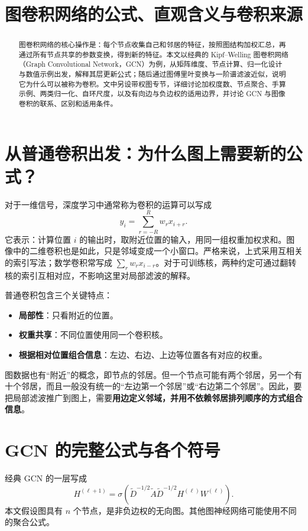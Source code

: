 \documentclass[UTF8,a4paper,11pt,fontset=fandol]{ctexart}
\title{图卷积网络的公式、直观含义与卷积来源}
\author{}
\date{}
\begin{document}
\maketitle
\begin{abstract}
图卷积网络的核心操作是：每个节点收集自己和邻居的特征，按照图结构加权汇总，再通过所有节点共享的参数变换，得到新的特征。本文以经典的 Kipf--Welling 图卷积网络（Graph Convolutional Network，GCN）为例，从矩阵维度、节点计算、归一化设计与数值示例出发，解释其层更新公式；随后通过图傅里叶变换与一阶谱滤波近似，说明它为什么可以被称为卷积。文中另设带权图专节，详细讨论加权度数、节点聚合、手算示例、两类归一化、自环尺度，以及有向边与负边权的适用边界，并讨论 GCN 与图像卷积的联系、区别和适用条件。
\end{abstract}
\tableofcontents
\newpage

\section{从普通卷积出发：为什么图上需要新的公式？}
对于一维信号，深度学习中通常称为卷积的运算可以写成
\begin{equation}
y_i=\sum_{r=-R}^{R}w_r x_{i+r}.
\end{equation}
它表示：计算位置 $i$ 的输出时，取附近位置的输入，用同一组权重加权求和。图像中的二维卷积也是如此，只是邻域变成一个小窗口。严格来说，上式采用互相关的索引写法；数学卷积常写成 $\sum_r w_r x_{i-r}$。对于可训练核，两种约定可通过翻转核的索引互相对应，不影响这里对局部滤波的解释。

普通卷积包含三个关键特点：
\begin{itemize}
\item \textbf{局部性}：只看附近的位置。
\item \textbf{权重共享}：不同位置使用同一个卷积核。
\item \textbf{根据相对位置组合信息}：左边、右边、上边等位置各有对应的权重。
\end{itemize}
图数据也有“附近”的概念，即节点的邻居。但一个节点可能有两个邻居，另一个有十个邻居，而且一般没有统一的“左边第一个邻居”或“右边第二个邻居”。因此，要把局部滤波推广到图上，需要\textbf{用边定义邻域，并用不依赖邻居排列顺序的方式组合信息}。

\section{GCN 的完整公式与各个符号}
经典 GCN 的一层写成
\begin{equation}
\boxed{
H^{(\ell+1)}=\sigma\!\left(
\widetilde D^{-1/2}\widetilde A\widetilde D^{-1/2}
H^{(\ell)}W^{(\ell)}\right).
}
\label{eq:gcn}
\end{equation}
本文假设图具有 $n$ 个节点，是非负边权的无向图。其他图神经网络可能使用不同的聚合公式。
\end{document}
